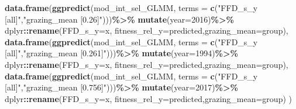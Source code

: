 \documentclass[
]{article}
\newenvironment{Shaded}{\begin{snugshade}}{\end{snugshade}}
\newcommand{\DataTypeTok}[1]{\textcolor[rgb]{0.13,0.29,0.53}{#1}}
\newcommand{\DecValTok}[1]{\textcolor[rgb]{0.00,0.00,0.81}{#1}}
\newcommand{\KeywordTok}[1]{\textcolor[rgb]{0.13,0.29,0.53}{\textbf{#1}}}
\newcommand{\NormalTok}[1]{#1}
\newcommand{\OperatorTok}[1]{\textcolor[rgb]{0.81,0.36,0.00}{\textbf{#1}}}
\newcommand{\StringTok}[1]{\textcolor[rgb]{0.31,0.60,0.02}{#1}}
\begin{document}
\begin{Shaded}
\begin{Highlighting}[]
    \KeywordTok{data.frame}\NormalTok{(}\KeywordTok{ggpredict}\NormalTok{(mod\_int\_sel\_GLMM,}
                         \DataTypeTok{terms =} \KeywordTok{c}\NormalTok{(}\StringTok{"FFD\_s\_y [all]"}\NormalTok{,}\StringTok{"grazing\_mean [0.26]"}\NormalTok{)))}\OperatorTok{\%\textgreater{}\%}
\StringTok{      }\KeywordTok{mutate}\NormalTok{(}\DataTypeTok{year=}\DecValTok{2016}\NormalTok{)}\OperatorTok{\%\textgreater{}\%}
\StringTok{      }\NormalTok{dplyr}\OperatorTok{::}\KeywordTok{rename}\NormalTok{(}\DataTypeTok{FFD\_s\_y=}\NormalTok{x, }\DataTypeTok{fitness\_rel\_y=}\NormalTok{predicted,}\DataTypeTok{grazing\_mean=}\NormalTok{group),}
    \KeywordTok{data.frame}\NormalTok{(}\KeywordTok{ggpredict}\NormalTok{(mod\_int\_sel\_GLMM,}
                         \DataTypeTok{terms =} \KeywordTok{c}\NormalTok{(}\StringTok{"FFD\_s\_y [all]"}\NormalTok{,}\StringTok{"grazing\_mean [0.261]"}\NormalTok{)))}\OperatorTok{\%\textgreater{}\%}
\StringTok{      }\KeywordTok{mutate}\NormalTok{(}\DataTypeTok{year=}\DecValTok{1994}\NormalTok{)}\OperatorTok{\%\textgreater{}\%}
\StringTok{      }\NormalTok{dplyr}\OperatorTok{::}\KeywordTok{rename}\NormalTok{(}\DataTypeTok{FFD\_s\_y=}\NormalTok{x, }\DataTypeTok{fitness\_rel\_y=}\NormalTok{predicted,}\DataTypeTok{grazing\_mean=}\NormalTok{group),}
    \KeywordTok{data.frame}\NormalTok{(}\KeywordTok{ggpredict}\NormalTok{(mod\_int\_sel\_GLMM,}
                         \DataTypeTok{terms =} \KeywordTok{c}\NormalTok{(}\StringTok{"FFD\_s\_y [all]"}\NormalTok{,}\StringTok{"grazing\_mean [0.756]"}\NormalTok{)))}\OperatorTok{\%\textgreater{}\%}
\StringTok{      }\KeywordTok{mutate}\NormalTok{(}\DataTypeTok{year=}\DecValTok{2017}\NormalTok{)}\OperatorTok{\%\textgreater{}\%}
\StringTok{      }\NormalTok{dplyr}\OperatorTok{::}\KeywordTok{rename}\NormalTok{(}\DataTypeTok{FFD\_s\_y=}\NormalTok{x, }\DataTypeTok{fitness\_rel\_y=}\NormalTok{predicted,}\DataTypeTok{grazing\_mean=}\NormalTok{group)}
\NormalTok{  )}
\end{Highlighting}
\end{Shaded}
\end{document}
